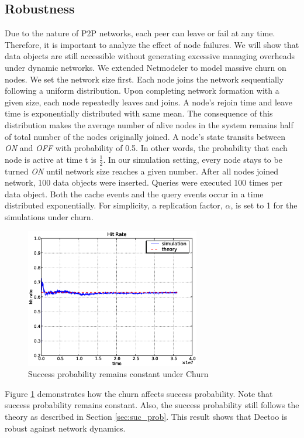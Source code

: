\documentclass[conference]{IEEEtran}
\begin{document}
\subsection{Robustness}
Due to the nature of P2P networks, each peer can leave or fail 
at any time. Therefore, it is important to analyze the effect of node failures.
We will show that data objects are still accessible without generating 
excessive managing overheads under dynamic networks.
We extended Netmodeler %
to model massive churn on nodes. 
We set the network size first. Each node joins the network sequentially
following a uniform distribution.
Upon completing network formation with a given size, each node repeatedly 
leaves and joins.
A node's rejoin time and leave time is exponentially distributed with same mean. 
%
The consequence of this distribution makes the average number of 
alive nodes in the system remains half of total number of the nodes 
originally joined. 
A node's state transits 
between \emph{ON} and \emph{OFF} with probability of 0.5. In other words, 
the probability that each node is active at time t is $\frac{1}{2}$.
In our simulation setting, every node stays to be turned \emph{ON} until 
network size reaches a given number. 
After all nodes joined network, 100 data objects were inserted.
Queries were executed 100 times per data object. 
Both the cache events and the query events occur 
in a time distributed exponentially.
For simplicity, a replication factor, $\alpha$, is set to 1 
for the simulations under churn.

\begin{figure}
\centering
\includegraphics[width=3in]{hit_ch}
\caption{Success probability remains constant under Churn} \label{fig:hit_churn}
\end{figure}
Figure \ref{fig:hit_churn} demonstrates how the churn affects success probability.
Note that success probability remains constant. 
Also, the success probability still follows the theory as described in Section \ref{sec:suc_prob}.
This result shows that Deetoo is robust against network dynamics. 
\end{document}
